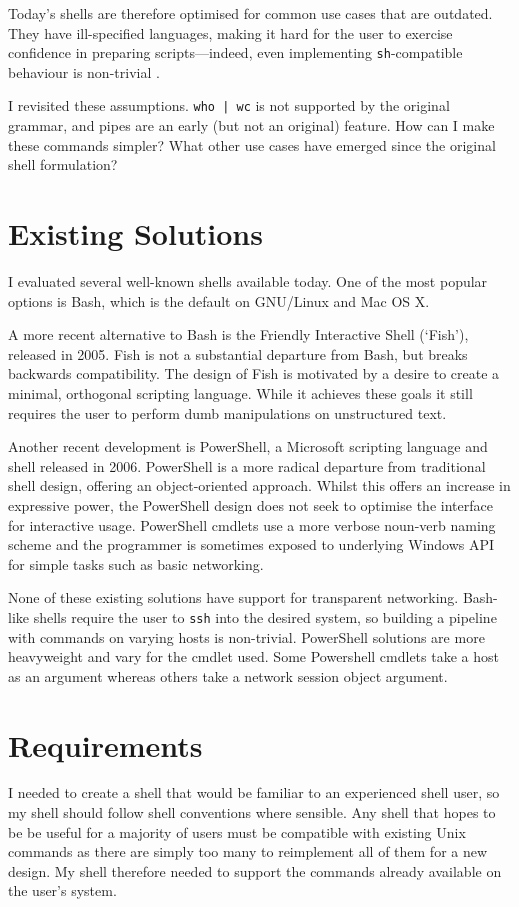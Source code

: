 \documentclass[12pt,twoside,notitlepage]{report}
\begin{document}
Today's shells are therefore optimised for common use cases that are
outdated. They have ill-specified languages, making it hard for the user to
exercise confidence in preparing scripts---indeed, even implementing
\texttt{sh}-compatible behaviour is non-trivial \cite{bourne}.

I revisited these assumptions. \texttt{who | wc} is not supported by the
original grammar, and pipes are an early (but not an original) feature. How can
I make these commands simpler? What other use cases have emerged since the
original shell formulation?

\section{Existing Solutions}
I evaluated several well-known shells available today. One of the most popular
options is Bash, which is the default on GNU/Linux and Mac OS X.

A more recent alternative to Bash is the Friendly Interactive Shell (`Fish'),
released in 2005. Fish is not a substantial departure from Bash, but breaks
backwards compatibility. The design of Fish \cite{fisdhesign} is motivated by a
desire to create a minimal, orthogonal scripting language. While it achieves
these goals it still requires the user to perform dumb manipulations on
unstructured text.

Another recent development is PowerShell, a Microsoft scripting language and
shell released in 2006. PowerShell is a more radical departure from traditional
shell design, offering an object-oriented approach. Whilst this offers an
increase in expressive power, the PowerShell design does not seek to optimise
the interface for interactive usage. PowerShell cmdlets use a more verbose
noun-verb naming scheme and the programmer is sometimes exposed to underlying
Windows API for simple tasks such as basic networking.

None of these existing solutions have support for transparent
networking. Bash-like shells require the user to {\tt ssh} into the
desired system, so building a pipeline with commands on varying hosts
is non-trivial. PowerShell solutions are more heavyweight and vary for
the cmdlet used. Some Powershell cmdlets take a host as an argument
whereas others take a network session object argument.

\section{Requirements}
I needed to create a shell that would be familiar to an experienced shell user,
so my shell should follow shell conventions where sensible. Any shell that hopes
to be be useful for a majority of users must be compatible with existing Unix
commands as there are simply too many to reimplement all of them for a new
design. My shell therefore needed to support the commands already available on
the user's system.
\end{document}
